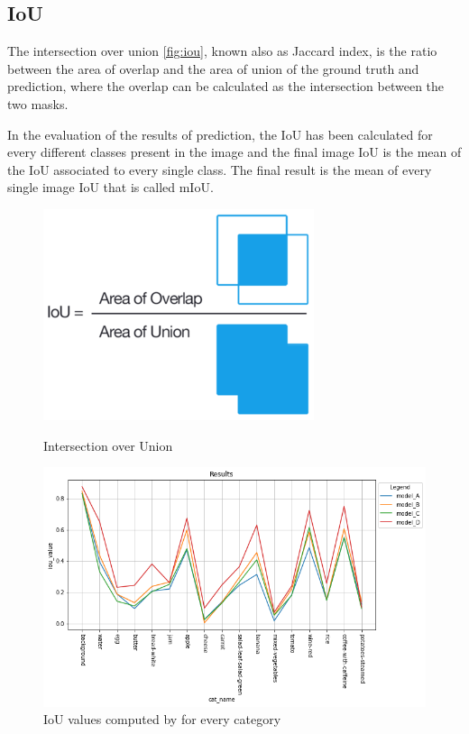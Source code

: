 \documentclass[a4paper,10pt]{report}
\begin{document}
\subsection{IoU}\label{subsec:subsection-511}

The intersection over union \ref{fig:iou}, known also as Jaccard index, is the ratio between the area of overlap and the area of union of the ground truth and prediction, where the overlap can be calculated as the intersection between the two masks.

In the evaluation of the results of prediction, the IoU has been calculated for every different classes present in the image and the final image IoU is the mean of the IoU associated to every single class.
The final result is the mean of every single image IoU that is called mIoU.


\begin{figure}[h]
  \centering\begin{minipage}[b]{0.37\textwidth}
    \includegraphics[width=\textwidth]{assets/img/IoU.png}
\caption{Intersection over Union}
\label{fig:iou}
  \end{minipage}
  \hfill\begin{minipage}[b]{0.60\textwidth}
    \includegraphics[width=\textwidth]{assets/img/cat_iou.png}
    \caption{IoU values computed by for every category}
\label{fig:cat_iou}
  \end{minipage}
\end{figure}
\end{document}

